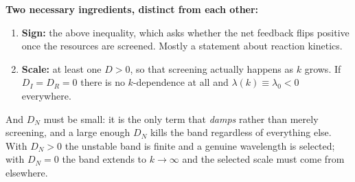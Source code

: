 \documentclass[11pt]{article}
\begin{document}
\textbf{Two necessary ingredients, distinct from each other:}

\begin{enumerate}
  \item \textbf{Sign:} the above inequality, which asks whether the net feedback flips positive once the resources are screened. Mostly a statement about reaction kinetics.
  \item \textbf{Scale:} at least one $D>0$, so that screening actually happens as $k$ grows. If $D_I=D_R=0$ there is no $k$-dependence at all and $\lambda(k)\equiv\lambda_0<0$ everywhere.
\end{enumerate}

And $D_N$ must be small: it is the only term that \emph{damps} rather than merely screening, and a large enough $D_N$ kills the band regardless of everything else. With $D_N>0$ the unstable band is finite and a genuine wavelength is selected; with $D_N = 0$ the band extends to $k\to\infty$ and the selected scale must come from elsewhere.
\end{document}
